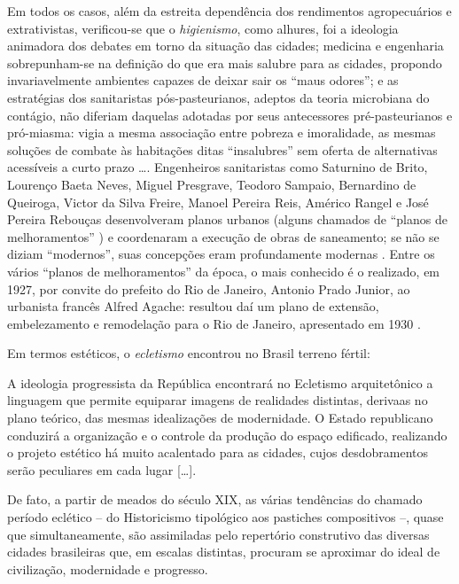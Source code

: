 Em todos os casos, além da estreita dependência dos rendimentos agropecuários e extrativistas, verificou-se que o \textit{higienismo}, como alhures, foi a ideologia animadora dos debates em torno da situação das cidades; medicina e engenharia sobrepunham-se na definição do que era mais salubre para as cidades, propondo invariavelmente ambientes capazes de deixar sair os ``maus odores''; e as estratégias dos sanitaristas pós-pasteurianos, adeptos da teoria microbiana do contágio, não diferiam daquelas adotadas por seus antecessores pré-pasteurianos e pró-miasma: vigia a mesma associação entre pobreza e imoralidade, as mesmas soluções de combate às habitações ditas ``insalubres'' sem oferta de alternativas acessíveis a curto prazo \dots \cite{CAPONI2002}. Engenheiros sanitaristas como Saturnino de Brito, Lourenço Baeta Neves, Miguel Presgrave, Teodoro Sampaio, Bernardino de Queiroga, Victor da Silva Freire, Manoel Pereira Reis, Américo Rangel e José Pereira Rebouças desenvolveram planos urbanos (alguns chamados de ``planos de melhoramentos'' \cite{leme_urbasp_1991}) e coordenaram a execução de obras de saneamento; se não se diziam ``modernos'', suas concepções eram profundamente modernas \cite{andrade_saturnino_1991}. Entre os vários ``planos de melhoramentos'' da época, o mais conhecido é o realizado, em 1927, por convite do prefeito do Rio de Janeiro, Antonio Prado Junior, ao urbanista francês Alfred Agache: resultou daí um plano de extensão, embelezamento e remodelação para o Rio de Janeiro, apresentado em 1930 \cite{pinheiro_capiconsul_2009}. 

Em termos estéticos, o \textit{ecletismo} encontrou no Brasil terreno fértil:

\begin{citacao}
A ideologia progressista da República encontrará no Ecletismo arquitetônico a linguagem que permite equiparar imagens de realidades distintas, derivaas no plano teórico, das mesmas idealizações de modernidade. O Estado republicano conduzirá a organização e o controle da produção do espaço edificado, realizando o projeto estético há muito acalentado para as cidades, cujos desdobramentos serão peculiares em cada lugar [\dots].

De fato, a partir de meados do século XIX, as várias tendências do chamado período eclético -- do Historicismo tipológico aos pastiches compositivos --, quase que simultaneamente, são assimiladas pelo repertório construtivo das diversas cidades brasileiras que, em escalas distintas, procuram se aproximar do ideal de civilização, modernidade e progresso. \cite[p.~259-260]{almeida_vitrinescomercio_2014}
\end{citacao}

